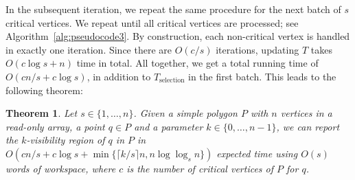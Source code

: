 \documentclass[11pt, a4paper]{article}
\newtheorem{thm}[theorem1]{Theorem}{\bfseries}{\itshape}
\begin{document}
In the subsequent iteration, we repeat the same procedure for the next 
batch of $s$ critical vertices. We repeat until all critical 
vertices are processed; see Algorithm~\ref{alg:pseudocode3}.
By construction, each non-critical vertex 
is handled in exactly one iteration. Since there 
are $O(c/s)$ iterations, updating $T$ 
takes $O(c\log s + n)$ time in total. All together, we get a 
total running time of $O(cn/s + c\log s)$, in addition to 
$T_\text{selection}$ in the first batch. This leads to the 
following theorem:

\begin{thm}\label{thm:improved-limited-workspace}
Let $s \in \{1, \dots, n\}$.
Given a simple polygon $P$ with $n$ vertices in a read-only array, 
a point $q \in P$ and a parameter $k \in \{0, \dots, n - 1\}$, we can 
report the $k$-visibility region of $q$ in $P$ in 
$O(cn/s+c\log{s}+\min\{\lceil k/s \rceil n,n\log{\log_s{n}}\})$ 
expected time using $O(s)$ words of workspace, 
where $c$ is the number of critical vertices of $P$ for $q$.
\end{thm}
\end{document}
